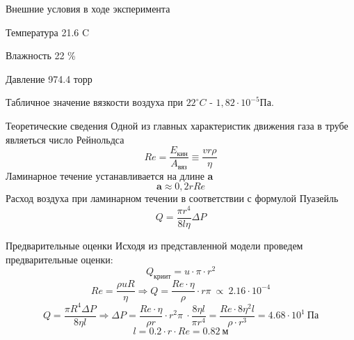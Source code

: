 \begin{frame}{Внешние условия в ходе эксперимента}
\begin{block}{Температура }
21.6 C
\end{block}
\begin{block}{Влажность }
22 \%
\end{block}
\begin{block}{Давление }
974.4 торр
\end{block}
Табличное значение вязкости воздуха при \(22^{\circ}C\) - \(1,82\cdot10^{-5}\)Па.
\end{frame}

\begin{frame}{Теоретические сведения}
    Одной из главных характеристик движения газа в трубе являеться число Рейнольдса \[Re = \frac{E_{\text{кин}}}{A_{\text{вяз}}} \equiv  \frac{v r\rho}{\eta} \]
    Ламинарное течение устанавливается на длине \textbf{a} \[\textbf{a} \approx 0,2rRe\]
    Расход воздуха при ламинарном течении в соответствии с формулой Пуазейль
    $$Q = \frac{\pi r^4}{8l\eta}\Delta P$$
\end{frame}
\begin{frame}{Предварительные оценки}
Исходя из представленной модели проведем предварительные оценки: 
$$ Q_{криит} = u \cdot \pi \cdot r^2$$
$$ Re  = \frac{\rho u R}{\eta} \Rightarrow  Q = \frac{Re \cdot \eta}{\rho} \cdot r \pi \ \propto \ 2.16 \cdot 10^{-4} $$
$$ Q = \frac{\pi R^4 \Delta P}{8 \eta l} \Rightarrow \Delta P = \frac{Re \cdot \eta}{\rho r} \cdot r^2 \pi \  \cdot \frac{8 \eta l}{\pi r^4} = \frac{Re \cdot 8 \eta^2 l}{\rho \cdot r^3} = 4.68 \cdot 10^{1} \ Па$$ 
$$ l = 0.2 \cdot r \cdot Re = 0.82 \ \text{м}$$
    
\end{frame}

